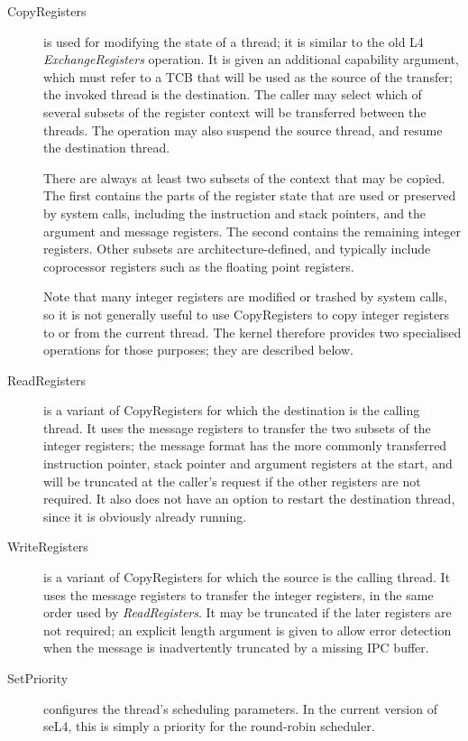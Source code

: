 \begin{description}
\item [CopyRegisters] is used for modifying the state of a thread; it is similar to the old L4 \emph{ExchangeRegisters} operation. It is given an additional capability argument, which must refer to a TCB that will be used as the source of the transfer; the invoked thread is the destination. The caller may select which of several subsets of the register context will be transferred between the threads. The operation may also suspend the source thread, and resume the destination thread.

There are always at least two subsets of the context that may be copied. The first contains the parts of the register state that are used or preserved by system calls, including the instruction and stack pointers, and the argument and message registers. The second contains the remaining integer registers. Other subsets are architecture-defined, and typically include coprocessor registers such as the floating point registers.

Note that many integer registers are modified or trashed by system calls, so it is not generally useful to use CopyRegisters to copy integer registers to or from the current thread. The kernel therefore provides two specialised operations for those purposes; they are described below.

\item [ReadRegisters] is a variant of CopyRegisters for which the destination is the calling thread. It uses the message registers to transfer the two subsets of the integer registers; the message format has the more commonly transferred instruction pointer, stack pointer and argument registers at the start, and will be truncated at the caller's request if the other registers are not required. It also does not have an option to restart the destination thread, since it is obviously already running.

\item [WriteRegisters] is a variant of CopyRegisters for which the source is the calling thread. It uses the message registers to transfer the integer registers, in the same order used by \emph{ReadRegisters}. It may be truncated if the later registers are not required; an explicit length argument is given to allow error detection when the message is inadvertently truncated by a missing IPC buffer.

\item [SetPriority] configures the thread's scheduling parameters. In the current version of seL4, this is simply a priority for the round-robin scheduler.


\end{description}
